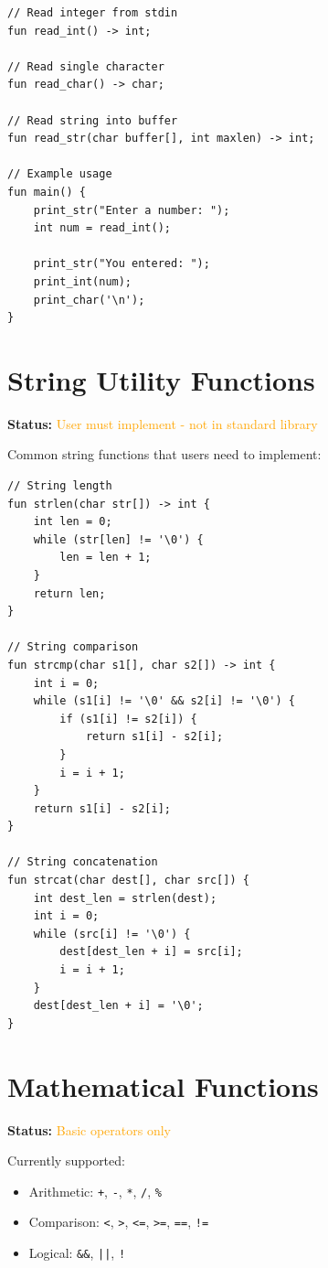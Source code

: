 \documentclass[12pt,a4paper,oneside]{book}
\newcommand{\code}[1]{\texttt{#1}}
\begin{document}
\begin{lstlisting}[style=algo, caption={Standard Input Functions}]
// Read integer from stdin
fun read_int() -> int;

// Read single character
fun read_char() -> char;

// Read string into buffer
fun read_str(char buffer[], int maxlen) -> int;

// Example usage
fun main() {
    print_str("Enter a number: ");
    int num = read_int();
    
    print_str("You entered: ");
    print_int(num);
    print_char('\n');
}
\end{lstlisting}

\section{String Utility Functions}

\textbf{Status:} \textcolor{orange}{User must implement - not in standard library}

Common string functions that users need to implement:

\begin{lstlisting}[style=algo, caption={User-Implemented String Functions}]
// String length
fun strlen(char str[]) -> int {
    int len = 0;
    while (str[len] != '\0') {
        len = len + 1;
    }
    return len;
}

// String comparison
fun strcmp(char s1[], char s2[]) -> int {
    int i = 0;
    while (s1[i] != '\0' && s2[i] != '\0') {
        if (s1[i] != s2[i]) {
            return s1[i] - s2[i];
        }
        i = i + 1;
    }
    return s1[i] - s2[i];
}

// String concatenation
fun strcat(char dest[], char src[]) {
    int dest_len = strlen(dest);
    int i = 0;
    while (src[i] != '\0') {
        dest[dest_len + i] = src[i];
        i = i + 1;
    }
    dest[dest_len + i] = '\0';
}
\end{lstlisting}

\section{Mathematical Functions}

\textbf{Status:} \textcolor{orange}{Basic operators only}

Currently supported:
\begin{itemize}
    \item Arithmetic: \code{+}, \code{-}, \code{*}, \code{/}, \code{\%}
    \item Comparison: \code{<}, \code{>}, \code{<=}, \code{>=}, \code{==}, \code{!=}
    \item Logical: \code{\&\&}, \code{||}, \code{!}
\end{itemize}
\end{document}
